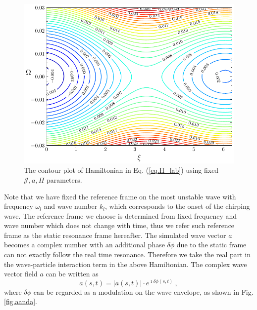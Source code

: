 \begin{figure}
    \centering
    \includegraphics[scale=0.5]{img/Hamcontour.pdf}
    \caption{The contour plot of Hamiltonian in Eq. (\ref{eq.H_lab}) using fixed $\mathcal{J}, a, \Pi$ parameters. 
    \label{fig.Hamcontour}
    }
\end{figure}

Note that we have fixed the reference frame on the most unstable wave with frequency $\omega_l$ and wave number $k_l$,
which corresponds to the onset of the chirping wave.
The reference frame we choose is determined from fixed frequency and wave number which does not change with time, thus we refer such reference frame as the static resonance frame hereafter. 
The simulated wave vector $a$ becomes a complex number with an additional phase $\delta \phi$ due to the static frame can not exactly follow the real time resonance. Therefore we take the real part in the wave-particle interaction term in the above Hamiltonian.
The complex wave vector field $a$ can be written as 
\begin{equation}
    a(s,t) = |a(s,t)| \cdot e^{\imath \delta \phi(s,t)}~,
\end{equation}
where $\delta \phi$ can be regarded as a modulation on the wave envelope, as shown in Fig. \ref{fig.aanda}.


